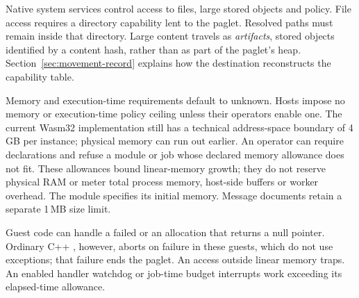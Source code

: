 Native system services control access to files, large stored objects
and policy. File access requires a directory capability lent to the
paglet. Resolved paths must remain inside that directory. Large content
travels as \emph{artifacts}, stored objects identified by a content hash,
rather than as part of the paglet's heap. Section~\ref{sec:movement-record}
explains how the destination reconstructs the capability table.

Memory and execution-time requirements default to unknown. Hosts impose
no memory or execution-time policy ceiling unless their operators enable
one. The current Wasm32 implementation still has a technical address-space
boundary of 4\,GB per instance; physical memory can run out earlier.
An operator can require declarations and refuse a module or job whose
declared memory allowance does not fit. These allowances bound linear-memory
growth; they do not reserve physical RAM or meter total process memory,
host-side buffers or worker overhead. The module specifies its initial
memory. Message documents retain a separate 1\,MB size limit.

Guest code can handle a failed  or an allocation that
returns a null pointer. Ordinary C++ , however, aborts on failure
in these guests, which do not use exceptions; that failure ends the
paglet. An access outside linear memory traps. An enabled handler watchdog
or job-time budget interrupts work exceeding its elapsed-time allowance.
